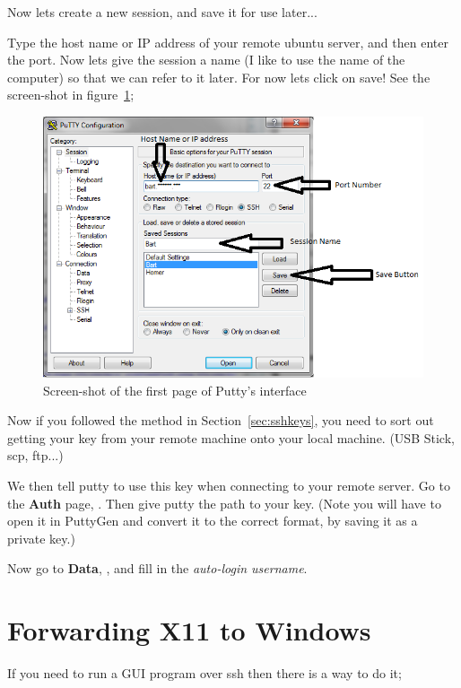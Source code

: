 Now lets create a new session, and save it for use later...

Type the host name or IP address of your remote ubuntu server, and then enter the port.  Now lets give the session a name (I like to use the name of the computer) so that we can refer to it later. For now lets click on save! See the screen-shot in figure~\ref{fig:putty1};

\begin{figure}[!th]
\centering
\includegraphics[scale=0.9]{./supportfiles/putty1}
\caption{Screen-shot of the first page of Putty's interface}
\label{fig:putty1}
\end{figure}

Now if you followed the method in Section~\ref{sec:sshkeys}, you need to sort out getting your key from your remote machine onto your local machine. (USB Stick, scp, ftp...)

We then tell putty to use this key when connecting to your remote server.  Go to the \textbf{Auth} page, .  Then give putty the path to your key.  (Note you will have to open it in PuttyGen and convert it to the correct format, by saving it as a private key.)

Now go to \textbf{Data}, , and fill in the \textit{auto-login username}.

\section{Forwarding X11 to Windows}
\label{sec:X11forwarding}

If you need to run a GUI program over ssh then there is a way to do it;

